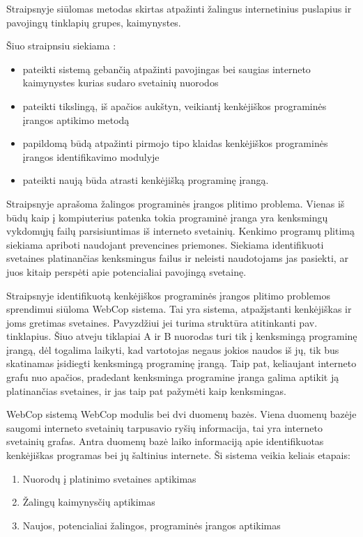 Straipsnyje  siūlomas  metodas skirtas atpažinti žalingus internetinius puslapius ir pavojingų tinklapių grupes, kaimynystes.

Šiuo straipnsiu siekiama \cite{webcop}:
    \begin{itemize}
        \item pateikti sistemą gebančią atpažinti pavojingas bei saugias interneto kaimynystes kurias sudaro svetainių nuorodos
         \item pateikti tikslingą, iš apačios aukštyn, veikiantį kenkėjiškos programinės įrangos aptikimo metodą
         \item papildomą būdą atpažinti pirmojo tipo klaidas kenkėjiškos programinės įrangos identifikavimo modulyje
         \item pateikti naują būda atrasti kenkėjišką programinę įrangą.
    \end{itemize}

Straipsnyje aprašoma žalingos programinės įrangos plitimo problema. Vienas iš būdų kaip į kompiuterius patenka  tokia programinė įranga yra kenksmingų vykdomųjų failų parsisiuntimas iš interneto svetainių. Kenkimo programų plitimą siekiama apriboti naudojant prevencines priemones. Siekiama identifikuoti svetaines platinančias kenksmingus failus ir neleisti naudotojams jas pasiekti, ar juos kitaip perspėti apie potencialiai pavojingą svetainę.

Straipsnyje identifikuotą kenkėjiškos programinės įrangos plitimo problemos sprendimui siūloma WebCop sistema. Tai yra sistema, atpažįstanti kenkėjiškas ir joms gretimas svetaines. Pavyzdžiui jei turima struktūra atitinkanti  pav. tinklapius. Šiuo atveju tiklapiai A ir B nuorodas turi tik į kenksmingą programinę įrangą, dėl togalima laikyti, kad vartotojas negaus jokios naudos iš jų, tik bus skatinamas įsidiegti kenksmingą programinę įrangą. Taip pat, keliaujant interneto grafu nuo apačios, pradedant kenksminga programine įranga galima aptikit ją platinančias svetaines, ir jas taip pat pažymėti kaip kenksmingas.


WebCop sistemą WebCop modulis bei dvi duomenų bazės. Viena duomenų bazėje saugomi interneto svetainių tarpusavio ryšių informacija, tai yra interneto svetainių grafas. Antra duomenų bazė laiko informaciją apie identifikuotas kenkėjiškas programas bei jų šaltinius internete. Ši sistema veikia keliais etapais:
    \begin{enumerate}[label=\arabic*.]
        \item Nuorodų į platinimo svetaines aptikimas
        \item Žalingų kaimynysčių aptikimas
        \item Naujos, potencialiai žalingos, programinės įrangos aptikimas
    \end{enumerate}

